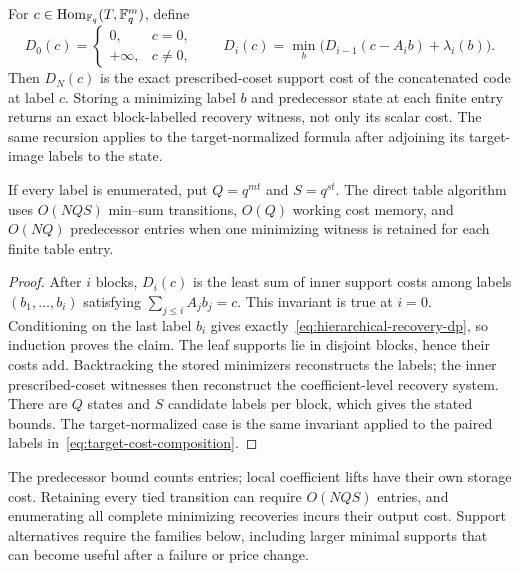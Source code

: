 \begin{proposition}
\label{prop:exact-hierarchical-optimizer}
%
%
%
For $c\in\operatorname{Hom}_{\mathbb F_q}(T,\mathbb F_q^m)$, define
\begin{equation}
 D_0(c)=\begin{cases}0,&c=0,\\+\infty,&c\ne0,\end{cases}
 \qquad
 D_i(c)=\min_b\bigl(D_{i-1}(c-A_i b)+\lambda_i(b)\bigr).
 \label{eq:hierarchical-recovery-dp}
\end{equation}
Then $D_N(c)$ is the exact prescribed-coset support cost of the concatenated
code at label $c$.  Storing a minimizing label $b$ and predecessor state at
each finite entry returns an exact block-labelled recovery witness, not only
its scalar cost.  The same recursion applies to the target-normalized formula
after adjoining its target-image labels to the state.

If every label is enumerated, put $Q=q^{mt}$ and $S=q^{st}$.  The direct
table algorithm uses $O(NQS)$ min--sum transitions, $O(Q)$ working cost
memory, and $O(NQ)$ predecessor entries when one minimizing witness is retained
for each finite table entry.
\end{proposition}

\begin{proof}
After $i$ blocks, $D_i(c)$ is the least sum of inner support costs among
labels $(b_1,\ldots,b_i)$ satisfying
$\sum_{j\leq i}A_jb_j=c$.  This invariant is true at $i=0$.  Conditioning on
the last label $b_i$ gives exactly~\eqref{eq:hierarchical-recovery-dp}, so
induction proves the claim.  The leaf supports lie in disjoint blocks, hence
their costs add.  Backtracking the stored minimizers reconstructs the labels;
the inner prescribed-coset witnesses then reconstruct the coefficient-level
recovery system.  There are $Q$ states and $S$ candidate labels per block,
which gives the stated bounds.  The target-normalized case is the same
invariant applied to the paired labels in~\eqref{eq:target-cost-composition}.
%
%
\end{proof}

The predecessor bound counts entries; local coefficient lifts have their own
storage cost.  Retaining every tied transition can require $O(NQS)$ entries,
and enumerating all complete minimizing recoveries incurs their output cost.
Support alternatives require the families below, including larger minimal
supports that can become useful after a failure or price change.

